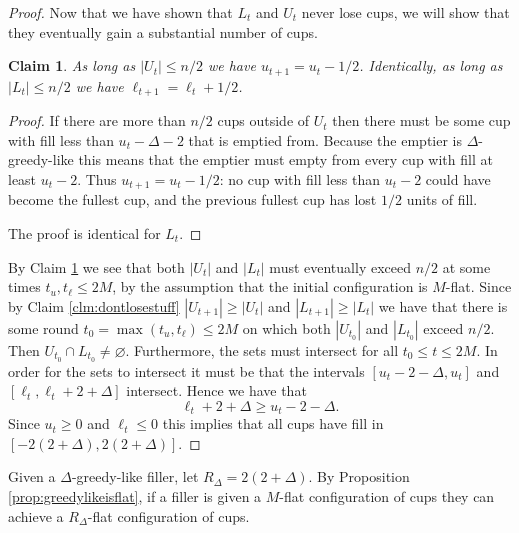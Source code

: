 \documentclass[twocolumn]{article}[10pt]
\newtheorem{clm}{Claim}
\begin{document}
\begin{proof}
  Now that we have shown that $L_t$ and $U_t$ never lose cups, we will show
  that they eventually gain a substantial number of cups. 

  \begin{clm}
    \label{clm:smallthenbigger}
    As long as $|U_t| \le n/2$ we have $u_{t+1} = u_t -1/2$. Identically, as
    long as $|L_t| \le n/2$ we have $\ell_{t+1} = \ell_t+ 1/2$.
  \end{clm}
  \begin{proof}
    If there are more than $n/2$ cups outside of $U_t$ then there must be some
    cup with fill less than $u_t-\Delta-2$ that is emptied from. Because the
    emptier is $\Delta$-greedy-like this means that the emptier must empty from
    every cup with fill at least $u_t-2$. Thus $u_{t+1} = u_t -1/2$: no cup
    with fill less than $u_t-2$ could have become the fullest cup, and the
    previous fullest cup has lost $1/2$ units of fill. 

    The proof is identical for $L_t$.
  \end{proof}

  By Claim \ref{clm:smallthenbigger} we see that both $|U_t|$ and $|L_t|$ must
  eventually exceed $n/2$ at some times $t_u, t_\ell \le 2M$, by the assumption
  that the initial configuration is $M$-flat. Since by Claim
  \ref{clm:dontlosestuff} $|U_{t+1}|\ge |U_t|$ and $|L_{t+1}| \ge |L_t|$ we
  have that there is some round $t_0 =\max(t_u, t_\ell) \le 2M$ on which both
  $|U_{t_0}|$ and $|L_{t_0}|$ exceed $n/2$. Then $U_{t_0} \cap L_{t_0} \neq
  \varnothing$. Furthermore, the sets must intersect for all $t_0 \le t \le 2M$. 
  In order for the sets to intersect it must be that the intervals
  $[u_t-2-\Delta, u_t]$ and $[\ell_t, \ell_t+2+\Delta]$ intersect. Hence we have that 
  $$\ell_t+2+\Delta \ge u_t-2-\Delta.$$ Since $u_t \ge 0$ and $\ell_t \le 0$
  this implies that all cups have fill in $[-2(2+\Delta), 2(2+\Delta)]$.

\end{proof}

Given a $\Delta$-greedy-like filler, let $R_\Delta = 2(2+\Delta).$ By
Proposition \ref{prop:greedylikeisflat}, if a filler is given a $M$-flat
configuration of cups they can achieve a $R_\Delta$-flat configuration of cups.
\end{document}
